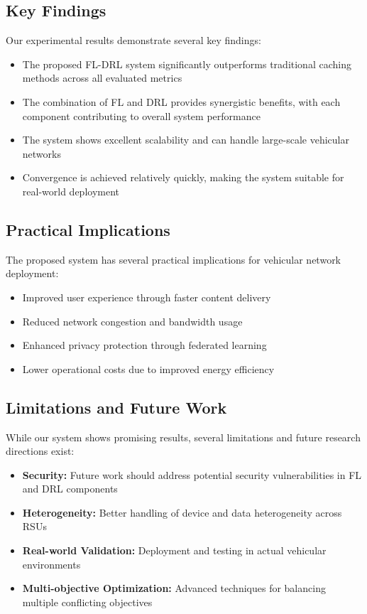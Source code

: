 \documentclass[conference]{IEEEtran}
\begin{document}
\subsection{Key Findings}

Our experimental results demonstrate several key findings:

\begin{itemize}
\item The proposed FL-DRL system significantly outperforms traditional caching methods across all evaluated metrics
\item The combination of FL and DRL provides synergistic benefits, with each component contributing to overall system performance
\item The system shows excellent scalability and can handle large-scale vehicular networks
\item Convergence is achieved relatively quickly, making the system suitable for real-world deployment
\end{itemize}

\subsection{Practical Implications}

The proposed system has several practical implications for vehicular network deployment:

\begin{itemize}
\item Improved user experience through faster content delivery
\item Reduced network congestion and bandwidth usage
\item Enhanced privacy protection through federated learning
\item Lower operational costs due to improved energy efficiency
\end{itemize}

\subsection{Limitations and Future Work}

While our system shows promising results, several limitations and future research directions exist:

\begin{itemize}
\item \textbf{Security:} Future work should address potential security vulnerabilities in FL and DRL components
\item \textbf{Heterogeneity:} Better handling of device and data heterogeneity across RSUs
\item \textbf{Real-world Validation:} Deployment and testing in actual vehicular environments
\item \textbf{Multi-objective Optimization:} Advanced techniques for balancing multiple conflicting objectives
\end{itemize}
\end{document}
